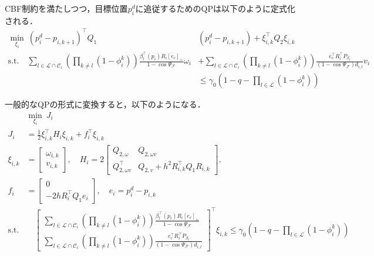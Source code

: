 CBF制約を満たしつつ，目標位置$p_i^d$に追従するためのQPは以下のように定式化される．
\begin{equation}
\begin{aligned}
\min_{\xi_i} \: (p^d_{i}-p_{i,{k+1}})^\top Q_1 & (p^d_{i}-p_{i,{k+1}})
+ \xi_{i,k}^\top Q_2 \xi_{i,k} \\
\mathrm{s.t.} \quad
\sum_{l\in \mathcal{L}\cap\mathcal{C}_i}(\prod_{k\neq l}(1-\phi_{i}^k)) \frac{\beta_l^\top(p_i) R_i [e_c]_\times}{1-\cos \Psi_\mathcal{F}}\omega_i &+ \sum_{l\in \mathcal{L}\cap\mathcal{C}_i}(\prod_{k\neq l}(1-\phi_{i}^k)) \frac{e_c^\top R_i^\top P_{\beta_l}}{(1-\cos \Psi_\mathcal{F})d_{i,l}}v_i \\
&\leq \gamma_0 (1-q-\prod_{l\in\mathcal{L}}(1-\phi_{i}^k))
\label{eq:qp_multi}
\end{aligned}
\end{equation}

一般的なQPの形式に変換すると，以下のようになる．
\begin{equation}
\begin{aligned}
&\min_{\xi_i}\:J_i \\
J_i &= \frac{1}{2}\xi_{i,k}^\top H_i \xi_{i,k} + f_i^\top \xi_{i,k} \\
\xi_{i,k} &= \begin{bmatrix}
\omega_{i,k}\\v_{i,k}
\end{bmatrix}, \quad
H_i = 2\begin{bmatrix}
Q_{2,\omega} & Q_{2,\omega v} \\ 
Q^\top_{2,\omega v} & Q_{2,v}+h^2R_{i,k}^\top Q_1R_{i,k}
\end{bmatrix}, \\
f_i &= \begin{bmatrix}
0 \\ -2hR_i^\top Q_1 e_i
\end{bmatrix}, \quad e_i = p^d_{i}-p_{i,k} \\
\mathrm{s.t.} &\quad
\begin{bmatrix}
\sum_{l\in \mathcal{L}\cap\mathcal{C}_i}(\prod_{k\neq l}(1-\phi_{i}^k)) \frac{\beta_l^\top(p_i) R_i [e_c]_\times}{1-\cos \Psi_\mathcal{F}} \\
\sum_{l\in \mathcal{L}\cap\mathcal{C}_i}(\prod_{k\neq l}(1-\phi_{i}^k))\frac{e_c^\top R_i^\top P_{\beta_l}}{(1-\cos \Psi_\mathcal{F})d_{i,l}}
\end{bmatrix}^\top \xi_{i,k} \leq
\gamma_0(1-q-\prod_{l\in \mathcal{L}}(1-\phi_{i}^k))
\label{eq:qp_multi_general}
\end{aligned}
\end{equation}

